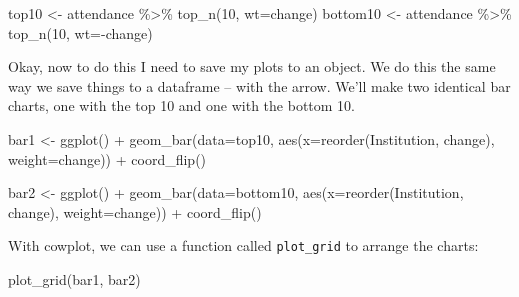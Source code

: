 \documentclass[
]{book}
\newenvironment{Shaded}{\begin{snugshade}}{\end{snugshade}}
\newcommand{\AttributeTok}[1]{\textcolor[rgb]{0.77,0.63,0.00}{#1}}
\newcommand{\DecValTok}[1]{\textcolor[rgb]{0.00,0.00,0.81}{#1}}
\newcommand{\FunctionTok}[1]{\textcolor[rgb]{0.00,0.00,0.00}{#1}}
\newcommand{\NormalTok}[1]{#1}
\newcommand{\OtherTok}[1]{\textcolor[rgb]{0.56,0.35,0.01}{#1}}
\newcommand{\SpecialCharTok}[1]{\textcolor[rgb]{0.00,0.00,0.00}{#1}}
\begin{document}
\begin{Shaded}
\begin{Highlighting}[]
\NormalTok{top10 }\OtherTok{\textless{}{-}}\NormalTok{ attendance }\SpecialCharTok{\%\textgreater{}\%} \FunctionTok{top\_n}\NormalTok{(}\DecValTok{10}\NormalTok{, }\AttributeTok{wt=}\NormalTok{change)}
\NormalTok{bottom10 }\OtherTok{\textless{}{-}}\NormalTok{ attendance }\SpecialCharTok{\%\textgreater{}\%} \FunctionTok{top\_n}\NormalTok{(}\DecValTok{10}\NormalTok{, }\AttributeTok{wt=}\SpecialCharTok{{-}}\NormalTok{change)}
\end{Highlighting}
\end{Shaded}

Okay, now to do this I need to save my plots to an object. We do this the same way we save things to a dataframe -- with the arrow. We'll make two identical bar charts, one with the top 10 and one with the bottom 10.

\begin{Shaded}
\begin{Highlighting}[]
\NormalTok{bar1 }\OtherTok{\textless{}{-}} \FunctionTok{ggplot}\NormalTok{() }\SpecialCharTok{+} \FunctionTok{geom\_bar}\NormalTok{(}\AttributeTok{data=}\NormalTok{top10, }\FunctionTok{aes}\NormalTok{(}\AttributeTok{x=}\FunctionTok{reorder}\NormalTok{(Institution, change), }\AttributeTok{weight=}\NormalTok{change)) }\SpecialCharTok{+} \FunctionTok{coord\_flip}\NormalTok{()}
\end{Highlighting}
\end{Shaded}

\begin{Shaded}
\begin{Highlighting}[]
\NormalTok{bar2 }\OtherTok{\textless{}{-}} \FunctionTok{ggplot}\NormalTok{() }\SpecialCharTok{+} \FunctionTok{geom\_bar}\NormalTok{(}\AttributeTok{data=}\NormalTok{bottom10, }\FunctionTok{aes}\NormalTok{(}\AttributeTok{x=}\FunctionTok{reorder}\NormalTok{(Institution, change), }\AttributeTok{weight=}\NormalTok{change)) }\SpecialCharTok{+} \FunctionTok{coord\_flip}\NormalTok{()}
\end{Highlighting}
\end{Shaded}

With cowplot, we can use a function called \texttt{plot\_grid} to arrange the charts:

\begin{Shaded}
\begin{Highlighting}[]
\FunctionTok{plot\_grid}\NormalTok{(bar1, bar2) }
\end{Highlighting}
\end{Shaded}
\end{document}
